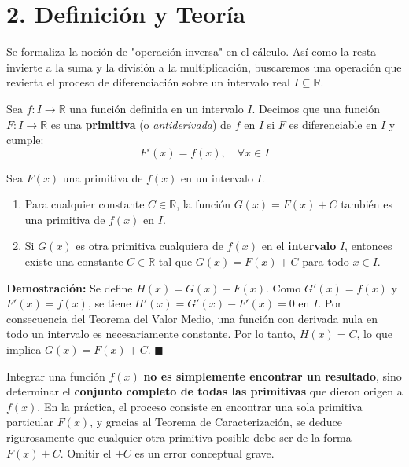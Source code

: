 \documentclass[11pt]{article}
\newenvironment{teoria}{\section*{2. Definición y Teoría}}{}
\newenvironment{definicion}[1]{\begin{tcolorbox}[colback=blue!5,colframe=blue!75!black,title=Definición: #1]}{\end{tcolorbox}}
\newenvironment{teorema}[1]{\begin{tcolorbox}[colback=green!5,colframe=green!75!black,title=Teorema: #1]}{\end{tcolorbox}}
\newenvironment{ejemplo}[1]{\begin{tcolorbox}[colback=gray!5,colframe=gray!60!black,title=Idea Clave: #1]}{\end{tcolorbox}}
\begin{document}
\begin{teoria}
  Se formaliza la noción de "operación inversa" en el cálculo. Así como la resta invierte a la suma y la división a la multiplicación, buscaremos una operación que revierta el proceso de diferenciación sobre un intervalo real $I \subseteq \mathbb{R}$.

  \begin{definicion}{Función Primitiva}
    Sea $f: I \to \mathbb{R}$ una función definida en un intervalo $I$. Decimos que una función $F: I \to \mathbb{R}$ es una \textbf{primitiva} (o \textit{antiderivada}) de $f$ en $I$ si $F$ es diferenciable en $I$ y cumple:
    \[ F'(x) = f(x), \quad \forall x \in I \]
  \end{definicion}

  \begin{teorema}{Caracterización de la Primitiva General}
    Sea $F(x)$ una primitiva de $f(x)$ en un intervalo $I$. 
    \begin{enumerate}
      \item Para cualquier constante $C \in \mathbb{R}$, la función $G(x) = F(x) + C$ también es una primitiva de $f(x)$ en $I$.
      \item Si $G(x)$ es otra primitiva cualquiera de $f(x)$ en el \textbf{intervalo} $I$, entonces existe una constante $C \in \mathbb{R}$ tal que $G(x) = F(x) + C$ para todo $x \in I$.
    \end{enumerate}
  \end{teorema}

  \textbf{Demostración:} Se define $H(x) = G(x) - F(x)$. Como $G'(x) = f(x)$ y $F'(x) = f(x)$, se tiene $H'(x) = G'(x) - F'(x) = 0$ en $I$.
  Por consecuencia del Teorema del Valor Medio, una función con derivada nula en todo un intervalo es necesariamente constante. Por lo tanto, $H(x) = C$, lo que implica $G(x) = F(x) + C$. $\blacksquare$

  \begin{ejemplo}{Integrar es buscar la totalidad de las primitivas}
    Integrar una función $f(x)$ \textbf{no es simplemente encontrar un resultado}, sino determinar el \textbf{conjunto completo de todas las primitivas} que dieron origen a $f(x)$. En la práctica, el proceso consiste en encontrar una sola primitiva particular $F(x)$, y gracias al Teorema de Caracterización, se deduce rigurosamente que cualquier otra primitiva posible debe ser de la forma $F(x) + C$. Omitir el $+C$ es un error conceptual grave.
  \end{ejemplo}


\end{teoria}
\end{document}
